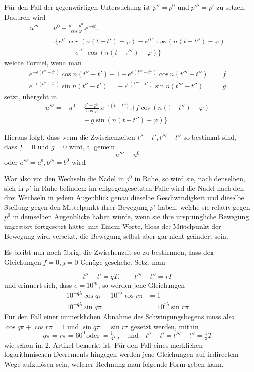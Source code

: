 Für den Fall der gegenwärtigen Untersuchung ist $p''=p^0$ und $p'''=p'$ zu setzen. Dadurch wird
\[
\begin{aligned}
u'''={}&u^0-\frac{p'-p^0}{\cos\varphi}.e^{-\epsilon t}.\\
&.\{e^{\epsilon t'}\cos(n(t-t')-\varphi)-e^{\epsilon t''}\cos(n(t-t'')-\varphi)\\
&\qquad+e^{\epsilon t'''}\cos(n(t-t''')-\varphi)\}
\end{aligned}
\]
welche Formel, wenn man
\[
\begin{aligned}
e^{-\epsilon(t''-t')}\cos n(t''-t')-1+e^{\epsilon(t'''-t'')}\cos n(t'''-t'')&=f\\
e^{-\epsilon(t''-t')}\sin n(t''-t')\phantom{-1}{}-e^{\epsilon(t'''-t'')}\sin n(t'''-t'')&=g
\end{aligned}
\]
setzt, übergeht in
\[
\begin{aligned}
u'''={}&u^0-\frac{p'-p^0}{\cos\varphi}.e^{-\epsilon(t-t'')}.\{f\cos(n(t-t'')-\varphi)\\
&\qquad-g\sin(n(t-t'')-\varphi)\}
\end{aligned}
\]

Hieraus folgt, dass wenn die Zwischenzeiten $t''-t',t'''-t''$ so bestimmt sind, dass $f=0$ und $g=0$ wird, allgemein
\[
u'''=u^0
\]
oder $a'''=a^0,b'''=b^0$ wird.

War also vor den Wechseln die Nadel in $p^0$ in Ruhe, so wird sie, nach denselben, sich in $p'$ in Ruhe befinden: im entgegengesetzten Falle wird die Nadel nach den drei Wechseln in jedem Augenblick genau dieselbe Geschwindigkeit und dieselbe Stellung gegen den Mittelpunkt ihrer Bewegung $p'$ haben, welche sie relativ gegen $p^0$ in demselben Augenblicke haben würde, wenn sie ihre ursprüngliche Bewegung ungestört fortgesetzt hätte: mit Einem Worte, bloss der Mittelpunkt der Bewegung wird versetzt, die Bewegung selbst aber gar nicht geändert sein.

Es bleibt nun noch übrig, die Zwischenzeit so zu bestimmen, dass den Gleichungen $f=0,g=0$ Genüge geschehe. Setzt man
\par\clearpage
{}
\[
t''-t'=qT,\qquad t'''-t''=rT
\]
und erinnert sich, dass $e=10^m$, so werden jene Gleichungen
\[
\begin{aligned}
10^{-q\lambda}\cos q\pi+10^{r\lambda}\cos r\pi&=1\\
10^{-q\lambda}\sin q\pi&=10^{r\lambda}\sin r\pi
\end{aligned}
\]
Für den Fall einer unmerklichen Abnahme des Schwingungsbogens muss also $\cos q\pi+\cos r\pi=1$ und $\sin q\pi=\sin r\pi$ gesetzt werden, mithin
\[
q\pi=r\pi=60^0\ \text{oder}\ =\tfrac{1}{3}\pi,\quad\text{und}\quad t''-t'=t'''-t''=\tfrac{1}{3}T
\]
wie schon im 2. Artikel bemerkt ist. Für den Fall eines merklichen logarithmischen Decrements hingegen werden jene Gleichungen auf indirectem Wege aufzulösen sein, welcher Rechnung man folgende Form geben kann.

